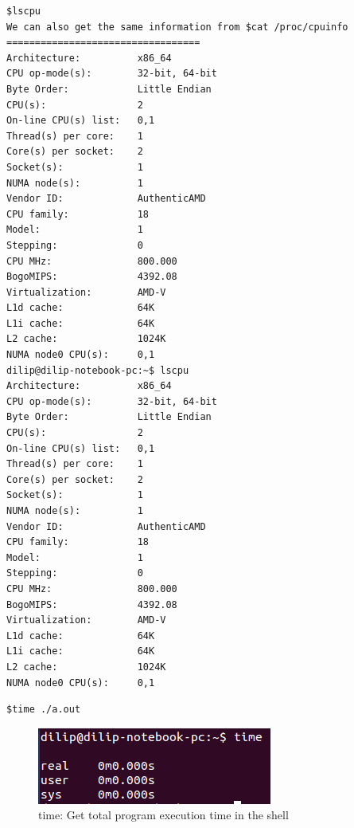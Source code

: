 \documentclass{sem5}
\begin{document}
\begin{lstlisting}[frame=single]
$lscpu
We can also get the same information from $cat /proc/cpuinfo 
==================================
Architecture:          x86_64
CPU op-mode(s):        32-bit, 64-bit
Byte Order:            Little Endian
CPU(s):                2
On-line CPU(s) list:   0,1
Thread(s) per core:    1
Core(s) per socket:    2
Socket(s):             1
NUMA node(s):          1
Vendor ID:             AuthenticAMD
CPU family:            18
Model:                 1
Stepping:              0
CPU MHz:               800.000
BogoMIPS:              4392.08
Virtualization:        AMD-V
L1d cache:             64K
L1i cache:             64K
L2 cache:              1024K
NUMA node0 CPU(s):     0,1
dilip@dilip-notebook-pc:~$ lscpu
Architecture:          x86_64
CPU op-mode(s):        32-bit, 64-bit
Byte Order:            Little Endian
CPU(s):                2
On-line CPU(s) list:   0,1
Thread(s) per core:    1
Core(s) per socket:    2
Socket(s):             1
NUMA node(s):          1
Vendor ID:             AuthenticAMD
CPU family:            18
Model:                 1
Stepping:              0
CPU MHz:               800.000
BogoMIPS:              4392.08
Virtualization:        AMD-V
L1d cache:             64K
L1i cache:             64K
L2 cache:              1024K
NUMA node0 CPU(s):     0,1

\end{lstlisting}
\begin{lstlisting}[frame=single]
$time ./a.out
\end{lstlisting}
\begin{figure}[!htp]
\centering
\includegraphics[scale=1]{3.png}
\caption{time: Get total program execution time in the shell}
\end{figure}
\end{document}
